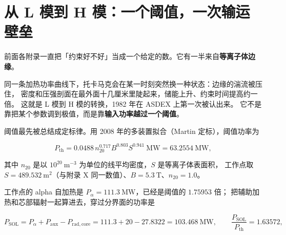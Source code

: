 
\section{从 L 模到 H 模：一个阈值，一次输运壁垒}
\label{sec:app-ad-threshold}
\setlength{\emergencystretch}{5em}

前面各附录一直把「约束好不好」当成一个给定的数。它有一半来自\textbf{等离子体边缘}。

同一条加热功率曲线下，托卡马克会在某一时刻突然换一种状态：边缘的湍流被压住，
密度和压强剖面在最外面十几厘米里陡起来，储能上升、约束时间提高约一倍。
这就是 L 模到 H 模的转换，1982 年在 ASDEX 上第一次被认出来。
它不是靠把某个参数调到极值，而是靠\textbf{输入功率越过一个阈值}。

阈值最先被总结成定标律。用 2008 年的多装置拟合（Martin 定标），阈值功率为

\begin{equation}
P_{\mathrm{th}}=0.0488\,n_{20}^{0.717}B^{0.803}S^{0.941}\ \mathrm{MW}
=63.2554\ \mathrm{MW},
\label{eq:app-ad-pth}
\end{equation}

其中 $n_{20}$ 是以 $10^{20}\ \mathrm{m^{-3}}$ 为单位的线平均密度，$S$ 是等离子体表面积，
工作点取 $S=489.532\ \mathrm{m^2}$（与附录 X 同一数值）、$B=5.3\ \mathrm{T}$、$n_{20}=1.0$。

工作点的 alpha 自加热是 $P_\alpha=111.3\ \mathrm{MW}$，已经是阈值的 $1.75953$ 倍；
把辅助加热和芯部辐射一起算进去，穿过分界面的功率是

\begin{equation}
P_{\mathrm{SOL}}=P_\alpha+P_{\mathrm{aux}}-P_{\mathrm{rad,core}}
=111.3+20-27.8322=103.468\ \mathrm{MW},
\qquad \frac{P_{\mathrm{SOL}}}{P_{\mathrm{th}}}=1.63572,
\label{eq:app-ad-psol}
\end{equation}


